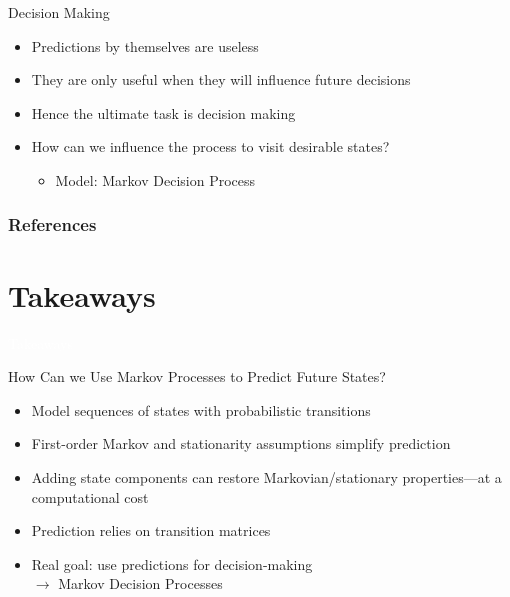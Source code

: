 \documentclass[11pt,table]{beamer}
\begin{document}
\begin{frame}{Decision Making}

\begin{itemize}
\item  Predictions by themselves are useless
\item They are only useful when they will influence future  decisions

\item Hence the ultimate task is decision making
\item How can we influence the process to visit desirable  states?

\begin{itemize}
     

\item Model: Markov Decision Process
 \end{itemize}
    \end{itemize}
\end{frame}

\begin{frame}[t,allowframebreaks
]%
\frametitle{References}
\small

\end{frame}
\section{Takeaways}
{
\begin{frame}
\centering
\Huge
\textcolor{white}{Takeaways}
\thispagestyle{empty}
\end{frame}
}

\begin{frame}{How Can we Use Markov Processes to Predict Future States?}
\begin{itemize}
    \item Model sequences of states with probabilistic transitions
    \item First-order Markov and stationarity assumptions simplify prediction
    \item Adding state components can restore Markovian/stationary properties---at a computational cost
    \item Prediction relies on transition matrices
    \item Real goal: use predictions for decision-making\\[2ex]
		$\rightarrow$ Markov Decision Processes
\end{itemize}
\end{frame}
\end{document}

